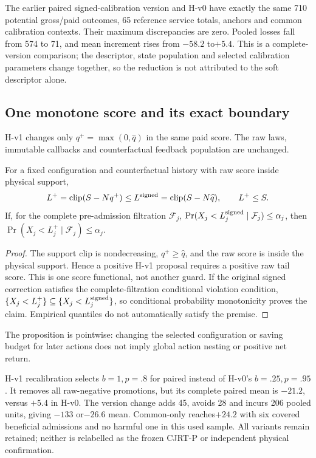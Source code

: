 The earlier paired signed-calibration version and H-v0 have exactly the
same 710 potential gross/paid outcomes, 65 reference service totals,
anchors and common calibration contexts. Their maximum discrepancies are
zero. Pooled losses fall from 574 to 71, and mean increment rises from
$-58.2$ to$+5.4$. This is a complete-version comparison; the descriptor,
state population and selected calibration parameters change together,
so the reduction is not attributed to the soft descriptor alone.

\subsection{One monotone score and its exact boundary}
H-v1 changes only $q^+=\max(0,\widehat q)$ in the same paid score. The raw
laws, immutable callbacks and counterfactual feedback population are
unchanged. \begin{proposition}
\label{prop:h-development-monotone}
For a fixed configuration and counterfactual history with raw score inside
physical support,
\begin{equation}
 L^+=\operatorname{clip}(S-Nq^+)\leq
 L^{\rm signed}=\operatorname{clip}(S-N\widehat q),\qquad L^+\leq S.
 \label{eq:h-development-monotone-score}
\end{equation}
If, for the complete pre-admission filtration $\mathcal F_j$,
$\Pr(X_j<L_j^{\rm signed}\mid\mathcal F_j)\leq\alpha_j$, then
$\Pr(X_j<L_j^+\mid\mathcal F_j)\leq\alpha_j$.
\end{proposition}
\begin{proof}
The support clip is nondecreasing, $q^+\geq\widehat q$, and the raw score
is inside the physical support. Hence a positive H-v1 proposal requires a
positive raw tail score. This is one score functional, not another guard.
If the original signed correction satisfies the complete-filtration
conditional violation condition, $\{X_j<L_j^+\}\subseteq\{X_j<L_j^{\rm signed}\}$,
so conditional probability monotonicity proves the claim.
Empirical quantiles do not automatically satisfy the premise.
\end{proof}
The proposition is pointwise: changing the selected configuration or
saving budget for later actions does not imply global action nesting or
positive net return.

H-v1 recalibration selects $b=1,p=.8$ for paired instead of H-v0's
$b=.25,p=.95$. It removes all raw-negative promotions, but its complete
paired mean is $-21.2$, versus $+5.4$ in H-v0. The version change adds 45,
avoids 28 and incurs 206 pooled units, giving $-133$ or$-26.6$ mean.
Common-only reaches$+24.2$ with six covered beneficial admissions and no
harmful one in this used sample. All variants remain retained; neither is
relabelled as the frozen CJRT-P or independent physical confirmation.

